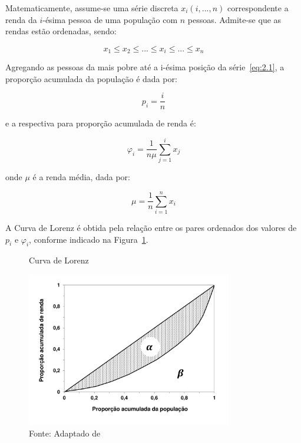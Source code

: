 Matematicamente, assume-se uma série discreta $x_i (i, ..., n)$ correspondente a renda da $i$-ésima pessoa de uma população com $n$ pessoas. Admite-se que as rendas estão ordenadas, sendo:

\begin{equation} 
    x_1 \leq x_2 \leq ... \leq x_i \leq ... \leq x_n
    \label{eq:2.1}
\end{equation}

Agregando as pessoas da mais pobre até a i-ésima posição da série~\ref{eq:2.1}, a proporção acumulada da população é dada por:

\begin{equation}
    p_{i} = \frac{i}{n}
\end{equation}

\noindent e a respectiva para proporção acumulada de renda é:

\begin{equation}
    \varphi_i = \frac{1}{n \mu} \sum_{j=1}^{i} x_j
\end{equation}

\noindent onde $\mu$ é a renda média, dada por:

\begin{equation}
    \mu = \frac{1}{n} \sum_{i=1}^{n} x_i
\end{equation}

A Curva de Lorenz é obtida pela relação entre os pares ordenados dos valores de $p_i$ e $\varphi_i$, conforme indicado na Figura~\ref{fig:lorenz_curve}.

\begin{figure}[!h]
   \centering
   \caption{Curva de Lorenz}
   \includegraphics[width=0.8\textwidth]{figs/cap02_curva_lorenz.pdf}
   \caption*{\footnotesize{Fonte: Adaptado de \cite{cap02_ref20}}}
   \label{fig:lorenz_curve}
\end{figure}

